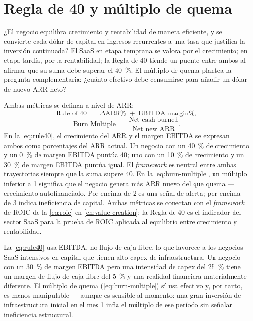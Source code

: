 \section{Regla de 40 y múltiplo de quema}\label{sec:rule40-burn}

¿El negocio equilibra crecimiento y rentabilidad de manera eficiente, y se convierte cada dólar de capital en ingresos recurrentes a una tasa que justifica la inversión continuada? El SaaS en etapa temprana se valora por el crecimiento; en etapa tardía, por la rentabilidad; la Regla de 40 tiende un puente entre ambos al afirmar que su suma debe superar el \qty{40}{\percent}. El múltiplo de quema plantea la pregunta complementaria: ¿cuánto efectivo debe consumirse para añadir un dólar de nuevo ARR neto?

Ambas métricas se definen a nivel de ARR:
\begin{equation}\label{eq:rule40}
  \text{Rule of 40} \;=\; \Delta\text{ARR\%} \;+\; \text{EBITDA margin\%},
\end{equation}
\begin{equation}\label{eq:burn-multiple}
  \text{Burn Multiple} \;=\; \frac{\text{Net cash burned}}{\text{Net new ARR}}.
\end{equation}
En la \cref{eq:rule40}, el crecimiento del ARR y el margen EBITDA se expresan ambos como porcentajes del ARR actual. Un negocio con un \qty{40}{\percent} de crecimiento y un \qty{0}{\percent} de margen EBITDA puntúa 40; uno con un \qty{10}{\percent} de crecimiento y un \qty{30}{\percent} de margen EBITDA puntúa igual. El \emph{framework} es neutral entre ambas trayectorias siempre que la suma supere 40. En la \cref{eq:burn-multiple}, un múltiplo inferior a 1 significa que el negocio genera más ARR nuevo del que quema --- crecimiento autofinanciado. Por encima de 2 es una señal de alerta; por encima de 3 indica ineficiencia de capital. Ambas métricas se conectan con el \emph{framework} de ROIC de la \cref{eq:roic} en \cref{ch:value-creation}: la Regla de 40 es el indicador del sector SaaS para la prueba de ROIC aplicada al equilibrio entre crecimiento y rentabilidad.

La \cref{eq:rule40} usa EBITDA, no flujo de caja libre, lo que favorece a los negocios SaaS intensivos en capital que tienen alto capex de infraestructura. Un negocio con un \qty{30}{\percent} de margen EBITDA pero una intensidad de capex del \qty{25}{\percent} tiene un margen de flujo de caja libre del \qty{5}{\percent} y una realidad financiera materialmente diferente. El múltiplo de quema (\cref{eq:burn-multiple}) sí usa efectivo y, por tanto, es menos manipulable --- aunque es sensible al momento: una gran inversión de infraestructura inicial en el mes 1 infla el múltiplo de ese período sin señalar ineficiencia estructural.

